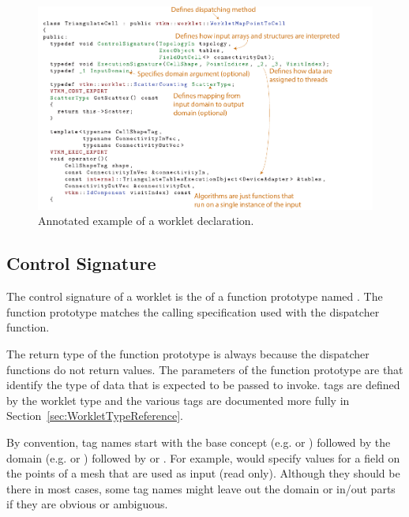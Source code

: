 \begin{figure}[htb]
  \includegraphics[width=\linewidth]{images/WorkletExampleAnnotated}
  \caption{Annotated example of a worklet declaration.}
  \label{fig:WorkletExampleAnnotated}
\end{figure}

\subsection{Control Signature}
\label{sec:ControlSignature}


The control signature of a worklet is the  of a function
prototype named \controlsignature. The function prototype matches the
calling specification used with the dispatcher  function.


The return type of the function prototype is always  because
the dispatcher  functions do not return values. The
parameters of the function prototype are 
that identify the type of data that is expected to be passed to invoke.
\controlsignature tags are defined by the worklet type and the various tags
are documented more fully in Section~\ref{sec:WorkletTypeReference}.

By convention, \controlsignature tag names start with the base concept
(e.g.  or ) followed by the
domain (e.g.  or ) followed by
 or . For example,
 would specify values for a field on the points of a
mesh that are used as input (read only). Although they should be there in
most cases, some tag names might leave out the domain or in/out parts if
they are obvious or ambiguous.

